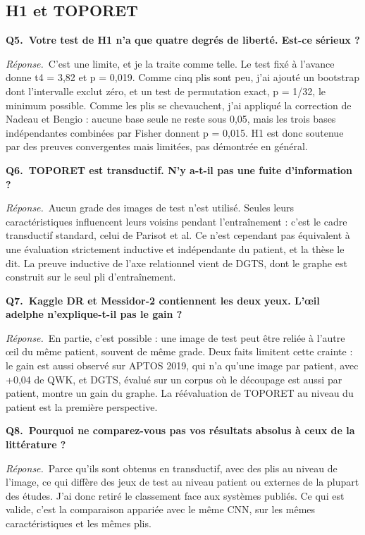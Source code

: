 \documentclass[11pt,a4paper]{article}
\begin{document}
\subsection*{H1 et TOPORET}
\textbf{Q5.~Votre test de H1 n'a que quatre degrés de liberté. Est-ce sérieux ?}\par\nopagebreak
\textit{Réponse.}~C'est une limite, et je la traite comme telle. Le test fixé à l'avance donne t4 = 3,82 et p = 0,019. Comme cinq plis sont peu, j'ai ajouté un bootstrap dont l'intervalle exclut zéro, et un test de permutation exact, p = 1/32, le minimum possible. Comme les plis se chevauchent, j'ai appliqué la correction de Nadeau et Bengio : aucune base seule ne reste sous 0,05, mais les trois bases indépendantes combinées par Fisher donnent p = 0,015. H1 est donc soutenue par des preuves convergentes mais limitées, pas démontrée en général.\par\medskip
\textbf{Q6.~TOPORET est transductif. N'y a-t-il pas une fuite d'information ?}\par\nopagebreak
\textit{Réponse.}~Aucun grade des images de test n'est utilisé. Seules leurs caractéristiques influencent leurs voisins pendant l'entraînement : c'est le cadre transductif standard, celui de Parisot et al. Ce n'est cependant pas équivalent à une évaluation strictement inductive et indépendante du patient, et la thèse le dit. La preuve inductive de l'axe relationnel vient de DGTS, dont le graphe est construit sur le seul pli d'entraînement.\par\medskip
\textbf{Q7.~Kaggle DR et Messidor-2 contiennent les deux yeux. L'œil adelphe n'explique-t-il pas le gain ?}\par\nopagebreak
\textit{Réponse.}~En partie, c'est possible : une image de test peut être reliée à l'autre œil du même patient, souvent de même grade. Deux faits limitent cette crainte : le gain est aussi observé sur APTOS 2019, qui n'a qu'une image par patient, avec +0,04 de QWK, et DGTS, évalué sur un corpus où le découpage est aussi par patient, montre un gain du graphe. La réévaluation de TOPORET au niveau du patient est la première perspective.\par\medskip
\textbf{Q8.~Pourquoi ne comparez-vous pas vos résultats absolus à ceux de la littérature ?}\par\nopagebreak
\textit{Réponse.}~Parce qu'ils sont obtenus en transductif, avec des plis au niveau de l'image, ce qui diffère des jeux de test au niveau patient ou externes de la plupart des études. J'ai donc retiré le classement face aux systèmes publiés. Ce qui est valide, c'est la comparaison appariée avec le même CNN, sur les mêmes caractéristiques et les mêmes plis.\par\medskip
\end{document}
